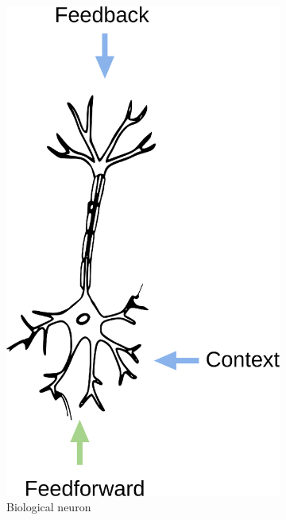\begin{figure}[htb]
\begin{subfigure}[b]{0.35\linewidth}
        \includegraphics[width=\linewidth]{resources/related_works/neuron_biological}
        \caption{Biological neuron}
    \end{subfigure}
    \hfill
    \begin{subfigure}[b]{0.55\linewidth}
        \centering

\end{subfigure}
\end{figure}
